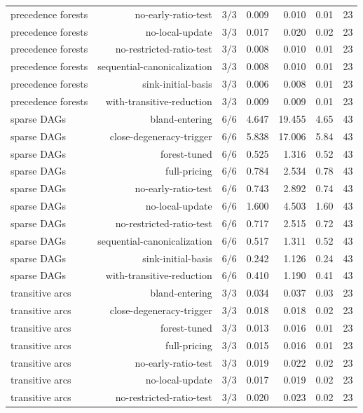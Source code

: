 {\begin{longtable}{lrrrrrr}
precedence forests & no-early-ratio-test & 3/3 & 0.009 & 0.010 & 0.01 & 23 \\
precedence forests & no-local-update & 3/3 & 0.017 & 0.020 & 0.02 & 23 \\
precedence forests & no-restricted-ratio-test & 3/3 & 0.008 & 0.010 & 0.01 & 23 \\
precedence forests & sequential-canonicalization & 3/3 & 0.008 & 0.010 & 0.01 & 23 \\
precedence forests & sink-initial-basis & 3/3 & 0.006 & 0.008 & 0.01 & 23 \\
precedence forests & with-transitive-reduction & 3/3 & 0.009 & 0.009 & 0.01 & 23 \\
sparse DAGs & bland-entering & 6/6 & 4.647 & 19.455 & 4.65 & 43 \\
sparse DAGs & close-degeneracy-trigger & 6/6 & 5.838 & 17.006 & 5.84 & 43 \\
sparse DAGs & forest-tuned & 6/6 & 0.525 & 1.316 & 0.52 & 43 \\
sparse DAGs & full-pricing & 6/6 & 0.784 & 2.534 & 0.78 & 43 \\
sparse DAGs & no-early-ratio-test & 6/6 & 0.743 & 2.892 & 0.74 & 43 \\
sparse DAGs & no-local-update & 6/6 & 1.600 & 4.503 & 1.60 & 43 \\
sparse DAGs & no-restricted-ratio-test & 6/6 & 0.717 & 2.515 & 0.72 & 43 \\
sparse DAGs & sequential-canonicalization & 6/6 & 0.517 & 1.311 & 0.52 & 43 \\
sparse DAGs & sink-initial-basis & 6/6 & 0.242 & 1.126 & 0.24 & 43 \\
sparse DAGs & with-transitive-reduction & 6/6 & 0.410 & 1.190 & 0.41 & 43 \\
transitive arcs & bland-entering & 3/3 & 0.034 & 0.037 & 0.03 & 23 \\
transitive arcs & close-degeneracy-trigger & 3/3 & 0.018 & 0.018 & 0.02 & 23 \\
transitive arcs & forest-tuned & 3/3 & 0.013 & 0.016 & 0.01 & 23 \\
transitive arcs & full-pricing & 3/3 & 0.015 & 0.016 & 0.01 & 23 \\
transitive arcs & no-early-ratio-test & 3/3 & 0.019 & 0.022 & 0.02 & 23 \\
transitive arcs & no-local-update & 3/3 & 0.017 & 0.019 & 0.02 & 23 \\
transitive arcs & no-restricted-ratio-test & 3/3 & 0.020 & 0.023 & 0.02 & 23 \\

\end{longtable}}
